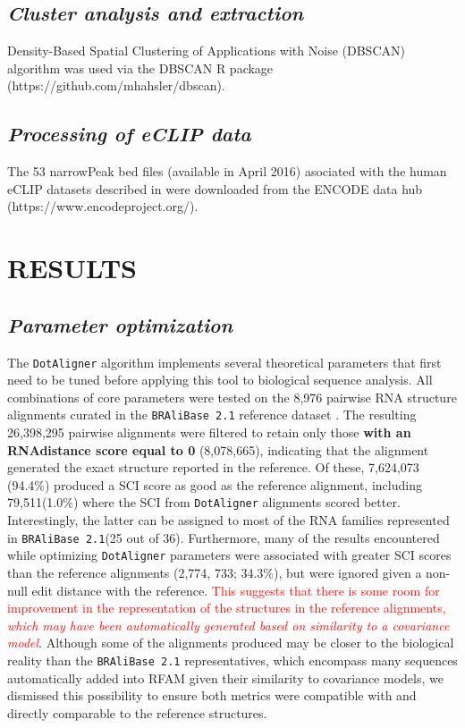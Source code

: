 \documentclass[a4paper,twoside]{article}
\newcommand\dotaligner{\texttt{DotAligner}}
\newcommand\bralibase{\texttt{BRAliBase 2.1}}
\newcommand{\RED}[1]{\textcolor{red}{#1}}
\begin{document}
\subsection{\textit{ Cluster analysis and extraction }}

Density-Based Spatial Clustering of Applications with Noise (DBSCAN) algorithm \cite{ester1996density} was used via the DBSCAN  R package (https://github.com/mhahsler/dbscan). 


\subsection{\textit{ Processing of eCLIP data }}
The 53 narrowPeak bed files (available in April 2016) asociated with the human eCLIP datasets described in 
\cite{van2016robust} were downloaded from the ENCODE data hub (https://www.encodeproject.org/). 



\section{\uppercase{Results}}
\subsection*{\textit{ Parameter optimization }}
The \dotaligner{} algorithm implements several theoretical parameters that first need to 
be tuned before applying this tool to biological sequence analysis. All combinations of 
core parameters were tested on the 8,976 pairwise RNA structure alignments  curated in the 
\bralibase{} reference dataset \cite{Wilm2006enhanced}.  The resulting 26,398,295 pairwise alignments were filtered to retain only those \textbf{with an 
RNAdistance score equal to 0 }(8,078,665), indicating that the 
 alignment generated the exact structure reported in the reference.  Of these, 
7,624,073 (94.4\%) produced a SCI score as good as the reference alignment, 
including 79,511(1.0\%) where the SCI from \dotaligner{} alignments scored better. 
Interestingly, the latter can be assigned to most of the RNA families represented 
in \bralibase   (25 out of 36). Furthermore, 
many of the results encountered while optimizing \dotaligner{} parameters were 
associated with greater SCI scores than the reference alignments (2,774, 733; 34.3\%), 
but were ignored given a non-null edit distance with the reference. 
\RED{This  suggests that there is some room for improvement in the representation of the structures in the reference alignments, \emph{which may have been automatically generated based on similarity to a covariance model}}. 
Although some of the alignments produced may be closer to the biological reality 
than the \bralibase{} representatives, which encompass many sequences automatically 
added into RFAM given their similarity to covariance models, we dismissed this 
possibility to ensure both metrics were compatible with and directly comparable 
to the reference structures. 
\end{document}
